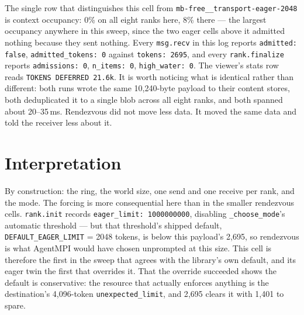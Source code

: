 \documentclass[11pt]{article}
\begin{document}
The single row that distinguishes this cell from \texttt{mb-free\_\_transport-eager-2048}
is context occupancy: 0\% on all eight ranks here, 8\% there --- the largest
occupancy anywhere in this sweep, since the two eager cells above it admitted nothing
because they sent nothing. Every \texttt{msg.recv} in this log reports
\texttt{admitted: false}, \texttt{admitted\_tokens: 0} against \texttt{tokens: 2695},
and every \texttt{rank.finalize} reports \texttt{admissions: 0}, \texttt{n\_items: 0},
\texttt{high\_water: 0}. The viewer's stats row reads \texttt{TOKENS DEFERRED 21.6k}.
It is worth noticing what is identical rather than different: both runs wrote the same
10{,}240-byte payload to their content stores, both deduplicated it to a single blob
across all eight ranks, and both spanned about 20--35\,ms. Rendezvous did not move
less data. It moved the same data and told the receiver less about it.

\section{Interpretation}

By construction: the ring, the world size, one send and one receive per rank, and the
mode. The forcing is more consequential here than in the smaller rendezvous cells.
\texttt{rank.init} records \texttt{eager\_limit: 1000000000}, disabling
\texttt{\_choose\_mode}'s automatic threshold --- but that threshold's shipped
default, \texttt{DEFAULT\_EAGER\_LIMIT} = 2048 tokens, is below this payload's 2{,}695,
so rendezvous is what AgentMPI would have chosen unprompted at this size. This cell
is therefore the first in the sweep that agrees with the library's own default, and
its eager twin the first that overrides it. That the override succeeded shows the
default is conservative: the resource that actually enforces anything is the
destination's 4{,}096-token \texttt{unexpected\_limit}, and 2{,}695 clears it with
1{,}401 to spare.
\end{document}
